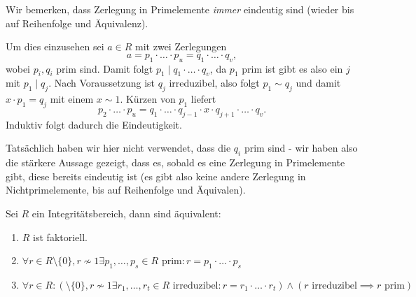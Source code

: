 \begin{remark}
    Wir bemerken, dass Zerlegung in Primelemente \emph{immer} eindeutig sind (wieder bis auf Reihenfolge und Äquivalenz).

    Um dies einzusehen sei $a \in R$ mit zwei Zerlegungen
    $$ a = p_1 \cdot \hdots \cdot p_u = q_1 \cdot \hdots \cdot q_v, $$
    wobei $p_i, q_i$ prim sind. Damit folgt $p_1 \mid q_1 \cdot \hdots \cdot q_v$, da $p_1$ prim ist gibt es also ein $j$ mit $p_1 \mid q_j$. Nach Voraussetzung ist $q_j$ irreduzibel, also folgt $p_1 \sim q_j$ und damit $x \cdot p_1 = q_j$ mit einem $x \sim 1$. Kürzen von $p_1$ liefert
    $$ p_2 \cdot \hdots \cdot p_u = q_1 \cdot \hdots \cdot q_{j-1} \cdot x \cdot q_{j+1} \cdot \hdots \cdot q_v. $$
    Induktiv folgt dadurch die Eindeutigkeit.

    Tatsächlich haben wir hier nicht verwendet, dass die $q_i$ prim sind - wir haben also die stärkere Aussage gezeigt, dass es, sobald es eine Zerlegung in Primelemente gibt, diese bereits eindeutig ist (es gibt also keine andere Zerlegung in Nichtprimelemente, bis auf Reihenfolge und Äquivalen).
\end{remark}

\begin{proposition}
    Sei $R$ ein Integritätsbereich, dann sind äquivalent:
    \begin{enumerate}
        \item $R$ ist faktoriell.
        \item $ \forall r \in R \setminus \{0\}, r \not\sim 1 \exists p_1, \hdots, p_s \in R \text{ prim}: r = p_1 \cdot \hdots \cdot p_s $
        \item $ \forall r \in R: ( \setminus \{0\}, r \not\sim 1 \exists r_1, \hdots, r_t \in R \text{ irreduzibel}: r = r_1 \cdot \hdots \cdot r_t ) \land ( r \text{ irreduzibel} \implies r \text{ prim} ) $
    \end{enumerate}
\end{proposition}


